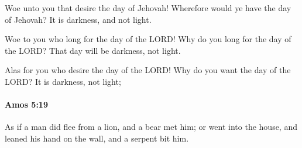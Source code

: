 			\begin{versebox}
					\item[BHS] 
					\item[LXX] 
					\item[ASV] Woe unto you that desire the day of Jehovah! Wherefore would ye have the day of Jehovah? It is darkness, and not light.
					\item[NIV] Woe to you who long for the day of the LORD! Why do you long for the day of the LORD? That day will be darkness, not light.
					\item[NRSV] Alas for you who desire the day of the LORD! Why do you want the day of the LORD? It is darkness, not light;
			\end{versebox}

		\paragraph{Amos 5:19} %
			\label{AMOS-5-19}

			As if a man did flee from a lion, and a bear met him; or went into the house, and leaned his hand on the wall, and a serpent bit him.

